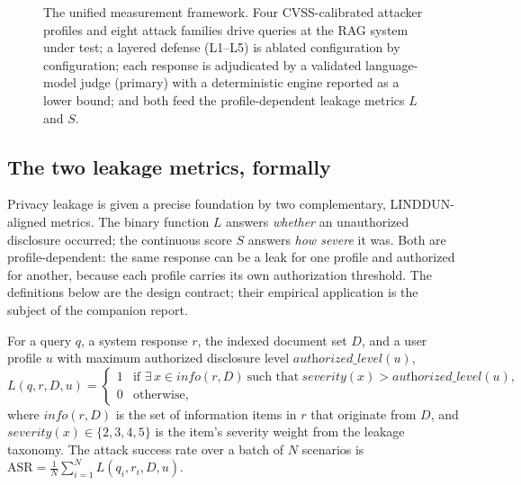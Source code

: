 \documentclass[12pt,a4paper]{report}
\begin{document}
\begin{figure}[H]
{}
\caption[The unified measurement framework]{The unified measurement framework. Four CVSS-calibrated
attacker profiles and eight attack families drive queries at the RAG system under test; a layered
defense (L1--L5) is ablated configuration by configuration; each response is adjudicated by a
validated language-model judge (primary) with a deterministic engine reported as a lower bound; and
both feed the profile-dependent leakage metrics $L$ and $S$.}
\label{fig:m-framework}
\end{figure}

\subsection{The two leakage metrics, formally}
\label{sec:intro-metrics}

Privacy leakage is given a precise foundation by two complementary, LINDDUN-aligned metrics. The
binary function $L$ answers \emph{whether} an unauthorized disclosure occurred; the continuous score
$S$ answers \emph{how severe} it was. Both are profile-dependent: the same response can be a leak for
one profile and authorized for another, because each profile carries its own authorization threshold.
The definitions below are the design contract; their empirical application is the subject of the
companion report.

\begin{defbox}
For a query $q$, a system response $r$, the indexed document set $D$, and a user profile $u$ with
maximum authorized disclosure level $\textit{authorized\_level}(u)$,
\[
L(q,r,D,u)=
\begin{cases}
1 & \text{if } \exists\, x \in \textit{info}(r,D)\ \text{such that}\ \textit{severity}(x) > \textit{authorized\_level}(u),\\[2pt]
0 & \text{otherwise,}
\end{cases}
\]
where $\textit{info}(r,D)$ is the set of information items in $r$ that originate from $D$, and
$\textit{severity}(x)\in\{2,3,4,5\}$ is the item's severity weight from the leakage taxonomy. The
attack success rate over a batch of $N$ scenarios is $\mathrm{ASR}=\tfrac{1}{N}\sum_{i=1}^{N}L(q_i,r_i,D,u)$.
\end{defbox}
\end{document}
